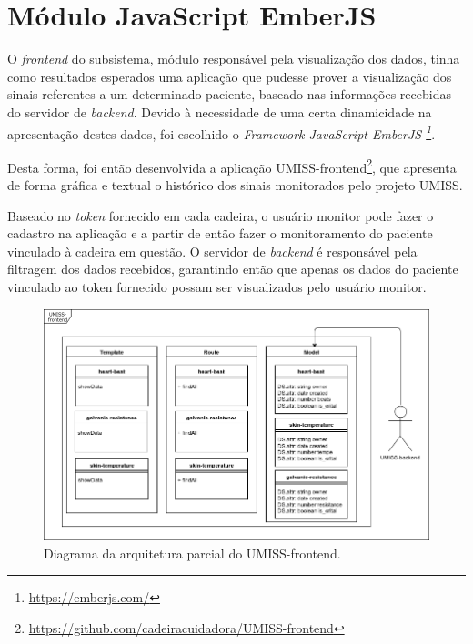 \section{Módulo JavaScript EmberJS}

O \textit{frontend} do subsistema, módulo responsável pela visualização dos
dados, tinha como resultados esperados uma aplicação que pudesse prover a
visualização dos sinais referentes a um determinado paciente, baseado nas
informações recebidas do servidor de \textit{backend}. Devido à necessidade de
uma certa dinamicidade na apresentação destes dados, foi escolhido o
\textit{Framework JavaScript EmberJS \footnote{\url{https://emberjs.com/}}}.

Desta forma, foi então desenvolvida a aplicação
UMISS-frontend\footnote{\url{https://github.com/cadeiracuidadora/UMISS-frontend}},
que apresenta de forma gráfica e textual o histórico dos sinais monitorados pelo
projeto UMISS.

Baseado no \textit{token} fornecido em cada cadeira, o usuário monitor pode
fazer o cadastro na aplicação e a partir de então fazer o monitoramento do
paciente vinculado à cadeira em questão. O servidor de \textit{backend} é
responsável pela filtragem dos dados recebidos, garantindo então que apenas os
dados do paciente vinculado ao token fornecido possam ser visualizados pelo
usuário monitor.

\begin{figure}
  \begin{center}
    \includegraphics[scale=0.5]{figuras/frontarch.png}
  \end{center}
  \caption{Diagrama da arquitetura parcial do UMISS-frontend.}
  \label{fig:frontarch}
\end{figure}
